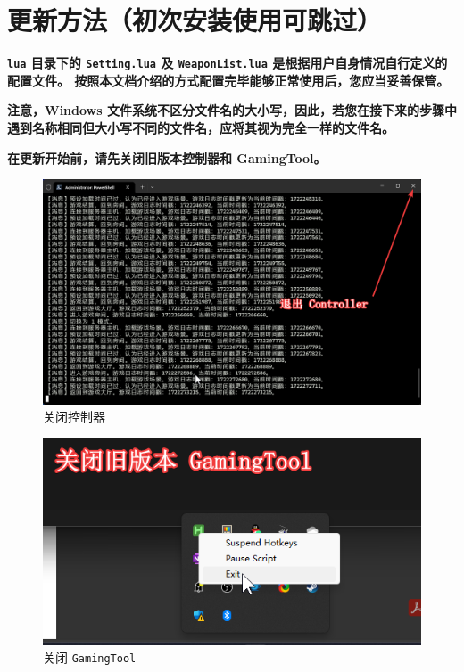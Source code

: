 \section{更新方法（初次安装使用可跳过）}

\textbf{\color{red}\lstinline{lua} 目录下的 \lstinline{Setting.lua} 及 \lstinline{WeaponList.lua} 是根据用户自身情况自行定义的配置文件。
按照本文档介绍的方式配置完毕能够正常使用后，您应当妥善保管。}

\textbf{\color{red}注意，Windows 文件系统不区分文件名的大小写，因此，若您在接下来的步骤中遇到名称相同但大小写不同的文件名，应将其视为完全一样的文件名。}


\textbf{\color{red}在更新开始前，请先关闭旧版本控制器和 GamingTool。}

\begin{figure}[H]
    \Centering
    \includegraphics[width=\textwidth]{docs/assets/update/close_controller.png}
    \caption{关闭控制器}
\end{figure}


\begin{figure}[H]
    \Centering
    \includegraphics[width=\textwidth]{docs/assets/update/close_gamingtool.png}
    \caption{关闭 \lstinline{GamingTool}}
\end{figure}

